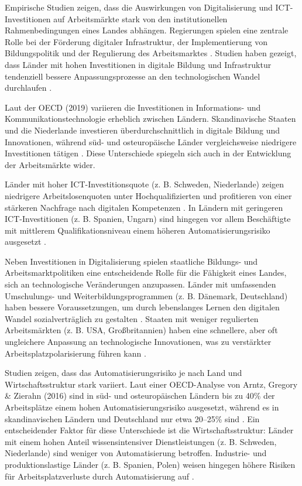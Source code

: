 Empirische Studien zeigen, dass die Auswirkungen von Digitalisierung und \ac{ICT}-Investitionen 
auf Arbeitsmärkte stark von den institutionellen Rahmenbedingungen eines Landes abhängen. 
Regierungen spielen eine zentrale Rolle bei der Förderung digitaler Infrastruktur, der 
Implementierung von Bildungspolitik und der Regulierung des Arbeitsmarktes 
\parencite[vgl.][S. 1–5]{hall2001varieties}. Studien haben gezeigt, dass Länder mit hohen 
Investitionen in digitale Bildung und Infrastruktur tendenziell bessere Anpassungsprozesse 
an den technologischen Wandel durchlaufen \parencite[vgl.][S. 23]{oecd2020digital}.

Laut der \ac{OECD} (2019) variieren die Investitionen in Informations- und 
Kommunikationstechnologie erheblich zwischen Ländern. Skandinavische Staaten und die Niederlande 
investieren überdurchschnittlich in digitale Bildung und Innovationen, während süd- und 
osteuropäische Länder vergleichsweise niedrigere Investitionen tätigen 
\parencite[vgl.][S. 45]{oecd2020digital}. Diese Unterschiede spiegeln sich auch in der 
Entwicklung der Arbeitsmärkte wider.

Länder mit hoher \ac{ICT}-Investitionsquote (z. B. Schweden, Niederlande) zeigen niedrigere 
Arbeitslosenquoten unter Hochqualifizierten und profitieren von einer stärkeren Nachfrage 
nach digitalen Kompetenzen \parencite[vgl.][S. 78]{brynjolfsson2014thesecond}. In Ländern mit 
geringeren \ac{ICT}-Investitionen (z. B. Spanien, Ungarn) sind hingegen vor allem Beschäftigte 
mit mittlerem Qualifikationsniveau einem höheren Automatisierungsrisiko ausgesetzt 
\parencite[vgl.][S. 12]{frey2013thefuture}.

Neben Investitionen in Digitalisierung spielen staatliche Bildungs- und Arbeitsmarktpolitiken 
eine entscheidende Rolle für die Fähigkeit eines Landes, sich an technologische Veränderungen 
anzupassen. Länder mit umfassenden Umschulungs- und Weiterbildungsprogrammen (z. B. Dänemark, 
Deutschland) haben bessere Voraussetzungen, um durch lebenslanges Lernen den digitalen Wandel 
sozialverträglich zu gestalten \parencite[vgl.][S. 361]{vu2011ict}. Staaten mit weniger 
regulierten Arbeitsmärkten (z. B. USA, Großbritannien) haben eine schnellere, aber oft 
ungleichere Anpassung an technologische Innovationen, was zu verstärkter 
Arbeitsplatzpolarisierung führen kann \parencite[vgl.][S. 172]{goos2014explaining}.

Studien zeigen, dass das Automatisierungsrisiko je nach Land und Wirtschaftsstruktur stark 
variiert. Laut einer \ac{OECD}-Analyse von Arntz, Gregory \& Zierahn (2016) sind in süd- und 
osteuropäischen Ländern bis zu 40\% der Arbeitsplätze einem hohen Automatisierungsrisiko 
ausgesetzt, während es in skandinavischen Ländern und Deutschland nur etwa 20–25\% sind 
\parencite[vgl.][S. 12]{arntz2016therisk}. Ein entscheidender Faktor für diese Unterschiede 
ist die Wirtschaftsstruktur: Länder mit einem hohen Anteil wissensintensiver Dienstleistungen 
(z. B. Schweden, Niederlande) sind weniger von Automatisierung betroffen. Industrie- und 
produktionslastige Länder (z. B. Spanien, Polen) weisen hingegen höhere Risiken für 
Arbeitsplatzverluste durch Automatisierung auf \parencite[vgl.][S. 260]{frey2013thefuture}.

